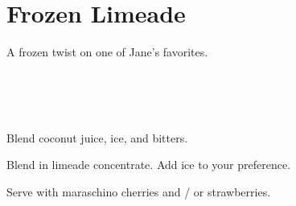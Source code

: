 \section[Frozen Limeade]{Frozen Limeade}


\begin{recipestats}[
	servings=8 people,
	preptime=10 \minute,
	source=Mike \& Jane,
]
\end{recipestats}


\begin{recipeabstract}
	A frozen twist on one of Jane's favorites.
\end{recipeabstract}


\begin{ingredientcolumns}[1]
	\begin{ingredientblock}
		\\
		\\
		\\
	\end{ingredientblock}
\end{ingredientcolumns}


\begin{preparation}
\item Blend coconut juice, ice, and bitters.

\item Blend in limeade concentrate.
	Add ice to your preference.
\end{preparation}


\begin{variation}
\item Serve with maraschino cherries and / or strawberries.
\end{variation}


\recipeend%
